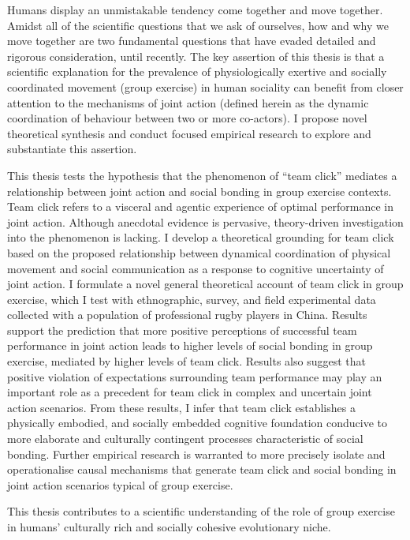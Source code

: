 Humans display an unmistakable tendency come together and move together.  Amidst all of the scientific questions that we ask of ourselves, how and why we move together are two fundamental questions that have evaded detailed and rigorous consideration, until recently.  The key assertion of this thesis is that a scientific explanation for the prevalence of physiologically exertive and socially coordinated movement (group exercise) in human sociality can benefit from closer attention to the mechanisms of joint action (defined herein as the dynamic coordination of behaviour between two or more co-actors).  I propose novel theoretical synthesis and conduct focused empirical research to explore and substantiate this assertion.

This thesis tests the hypothesis that the phenomenon of ``team click'' mediates a relationship between joint action and social bonding in group exercise contexts.  Team click refers to a visceral and agentic experience of optimal performance in joint action.  Although anecdotal evidence is pervasive, theory-driven investigation into the phenomenon is lacking.  I develop a theoretical grounding for team click based on the proposed relationship between dynamical coordination of physical movement and social communication as a response to cognitive uncertainty of joint action.  I formulate a novel general theoretical account of team click in group exercise, which I test with ethnographic, survey, and field experimental data collected with a population of professional rugby players in China.  Results support the prediction that more positive perceptions of successful team performance in joint action leads to higher levels of social bonding in group exercise, mediated by higher levels of team click.  Results also suggest that positive violation of expectations surrounding team performance may play an important role as a precedent for team click in complex and uncertain joint action scenarios.  From these results, I infer that team click establishes a physically embodied, and socially embedded cognitive foundation conducive to more elaborate and culturally contingent processes characteristic of social bonding.  Further empirical research is warranted to more precisely isolate and operationalise causal mechanisms that generate team click and social bonding in joint action scenarios typical of group exercise.

This thesis contributes to a scientific understanding of the role of group exercise in humans' culturally rich and socially cohesive evolutionary niche.


